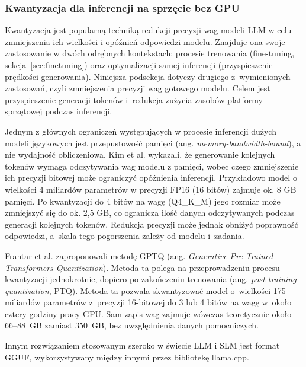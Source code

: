 \subsubsection{Kwantyzacja dla inferencji na sprzęcie bez GPU}\label{subsec:quantization}

Kwantyzacja jest popularną techniką redukcji precyzji wag modeli LLM w celu zmniejszenia ich wielkości i opóźnień odpowiedzi modelu. Znajduje ona swoje zastosowanie w dwóch odrębnych kontekstach: procesie trenowania (fine-tuning, sekcja~\ref{sec:finetuning}) oraz optymalizacji samej inferencji (przyspieszenie prędkości generowania). Niniejsza podsekcja dotyczy drugiego z~wymienionych zastosowań, czyli zmniejszenia precyzji wag gotowego modelu. Celem jest przyspieszenie generacji tokenów i~redukcja zużycia zasobów platformy sprzętowej podczas inferencji.

Jednym z głównych ograniczeń występujących w procesie inferencji dużych modeli językowych jest przepustowość pamięci (ang. \textit{memory-bandwidth-bound}), a nie wydajność obliczeniowa. Kim et al. \cite{Kim2023SqueezeLLM} wykazali, że generowanie kolejnych tokenów wymaga odczytywania wag modelu z pamięci, wobec czego zmniejszenie ich precyzji bitowej może ograniczyć opóźnienia inferencji. Przykładowo model o wielkości 4 miliardów parametrów w precyzji FP16 (16 bitów) zajmuje ok. 8 GB pamięci. Po kwantyzacji do 4 bitów na wagę (Q4\_K\_M) jego rozmiar może zmniejszyć się do ok. 2,5 GB, co ogranicza ilość danych odczytywanych podczas generacji kolejnych tokenów. Redukcja precyzji może jednak obniżyć poprawność odpowiedzi, a~skala tego pogorszenia zależy od modelu i~zadania.

Frantar et al. \cite{Frantar2023} zaproponowali metodę GPTQ (ang. \textit{Generative Pre-Trained Transformers Quantization}). Metoda ta polega na przeprowadzeniu procesu kwantyzacji jednokrotnie, dopiero po zakończeniu trenowania (ang. \textit{post-training quantization}, PTQ). Metoda ta pozwala skwantyzować model o~wielkości 175 miliardów parametrów z~precyzji 16-bitowej do 3 lub 4 bitów na wagę w~około cztery godziny pracy GPU. Sam zapis wag zajmuje wówczas teoretycznie około 66--88~GB zamiast 350~GB, bez uwzględnienia danych pomocniczych.

Innym rozwiązaniem stosowanym szeroko w świecie LLM i SLM jest format GGUF, wykorzystywany między innymi przez bibliotekę llama.cpp.

